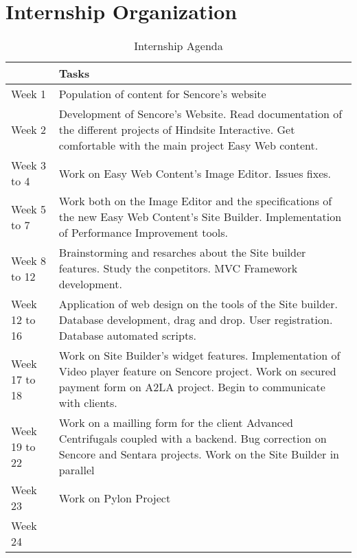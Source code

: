\chapter{Internship Organization}

\begin{table}[!ht]
	\caption{\label{tableau:agenda}Internship Agenda}
	\begin{tabular}{ | l | p{12cm} | }
		\hline
		 & Tasks\\
		\hline
		Week 1	&	Population of content for Sencore's website\\	\hline
		Week 2	&	Development of Sencore's Website. Read documentation of the different projects of Hindsite Interactive. Get comfortable with the main project Easy Web content.\\	\hline
		Week 3 to 4	&	Work on Easy Web Content's Image Editor. Issues fixes.\\	\hline
		Week 5 to 7	&	Work both on the Image Editor and the specifications of the new Easy Web Content's Site Builder. Implementation of Performance Improvement tools.\\	\hline
		Week 8 to 12	&	Brainstorming and resarches about the Site builder features. Study the conpetitors. MVC Framework development.\\	\hline
		Week 12 to 16	&	Application of web design on the tools of the Site builder. Database development, drag and drop. User registration. Database automated scripts.	\\	\hline
		Week 17	to 18&	Work on Site Builder's widget features. Implementation of Video player feature on Sencore project. Work on secured payment form on A2LA project. Begin to communicate with clients.\\	\hline
		Week 19	to 22 &	Work on a mailling form for the client Advanced Centrifugals coupled with a backend. Bug correction on Sencore and Sentara projects. Work on the Site Builder in parallel\\	\hline
		Week 23	&	Work on Pylon Project\\	\hline
		Week 24	&	\\	\hline
	\end{tabular}
\end{table}